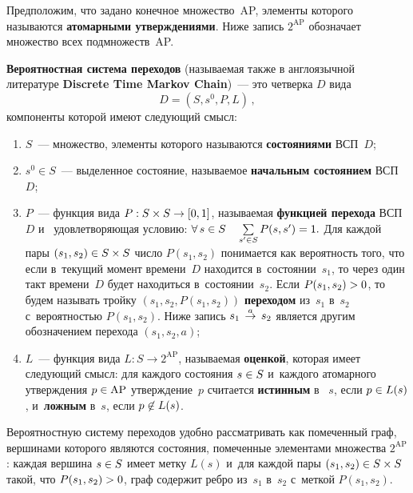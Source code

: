 \begin{multicols}{2}
Предположим, что задано конечное множество~AP, элементы которого
называются {\bf атомарными утверждениями}.
Ниже запись $2^{\mathrm{AP}}$ обозначает множество всех подмножеств~AP.

{\bf Вероятностная система переходов}
(называемая также в англоязычной литературе {\bf Discrete Time Markov Chain})~---
это четверка $D$ вида
\begin{equation*} %
D=(S, s^0, P, L)\,,
\end{equation*}
компоненты которой имеют следующий смысл:
\begin{enumerate}[(1)]
\item  $S$~---  множество,    элементы которого называются
    {\bf состояниями} ВСП~$D$;
\item  $s^0 \in S$~--- выделенное состояние, называемое
 {\bf начальным состоянием} ВСП~$D$;
 \item  $P$~--- функция вида $P:S\times S\hm\to [0,1]$,
   на\-зы\-ва\-емая {\bf функцией перехода} ВСП~$D$ и~ удовлетворяющая условию:
  $\forall\, s\hm\in S\quad
  \sum\limits_{s'\in S}P(s,s')\hm=1.$
Для каждой пары $(s_1,s_2)\hm \in S\times S$
число $P(s_1,s_2)$ понимается как вероятность
того, что если в~текущий момент времени~$D$ находится в~состоянии~$s_1$,
то через один такт времени~$D$ будет находиться
в~состоянии~$s_2$.
Если $P(s_1,s_2)\hm>0$, то будем называть тройку
$(s_1, s_2, P(s_1,s_2))$ {\bf переходом} из~$s_1$ в~$s_2$
с~вероятностью $P(s_1,s_2)$. Ниже запись $s_1\;\mathop{\to}\limits^{a}\;s_2$ является другим обозначением
перехода $(s_1, s_2, a)$;\\[-14pt]

\item $L$~--- функция вида
$L:S\to 2^{\mathrm{AP}}$, называемая {\bf оценкой}, которая имеет следующий смысл:
   для каждого состояния    $s\hm\in S$ и~каждого атомарного утверждения
   $p\hm\in \mathrm{AP}$ утверждение~$p$  считается
{\bf истинным} в~ $s$, если $p\hm\in L(s)$, и~{\bf ложным} в~$s$,
если $p\hm\not\in L(s)$.
\end{enumerate}


Вероятностную систему переходов удобно рассматривать как помеченный граф, вершинами которого
являются состояния, помеченные элементами множества $2^{\mathrm{AP}}$: каждая
вершина $s\hm\in S$ имеет метку $L(s)$ и~для каждой пары $(s_1,s_2)\hm\in
S\times S$ такой, что  $P(s_1, s_2) \hm>0$, граф содержит
ребро из~$s_1$ в~$s_2$ с~меткой $P(s_1, s_2)$.

\vspace*{-7pt}


\end{multicols}
